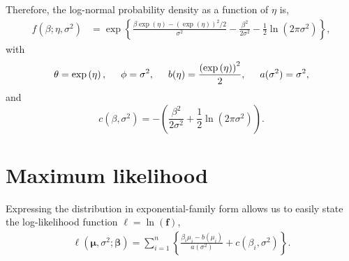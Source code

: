 Therefore, the log-normal probability density as a function of $\eta$ is,
\begin{align*}
  f(\beta; \eta, \sigma^2) &= \exp\left\{ \frac{\beta \exp\left(\eta \right) - \left( \exp\left(\eta \right) \right)^2 / 2}{\sigma^2} - \frac{\beta^2}{2\sigma^2} - \frac{1}{2}\ln\left( 2\pi \sigma^2 \right)  \right\},
\end{align*}
with
$$\theta = \exp\left( \eta \right), \hspace{5mm} \phi = \sigma^2, \hspace{5mm} b(\eta) = \frac{\left( \exp\left( \eta \right) \right)^2}{2}, \hspace{5mm} a(\sigma^2) = \sigma^2,$$
and
$$c(\beta,\sigma^2) = - \left( \frac{\beta^2}{2\sigma^2} + \frac{1}{2}\ln\left( 2\pi \sigma^2 \right) \right).$$

\section{Maximum likelihood}

Expressing the distribution in exponential-family form allows us to easily state the log-likelihood function $\bm{\ell} = \ln(\bm{f})$,
\begin{align*}
  \bm{\ell}(\bm{\mu}, \sigma^2; \bm{\beta}) = \sum_{i=1}^n \left\{ \frac{\beta_i \mu_i - b(\mu_i)}{a(\sigma^2)} + c(\beta_i,\sigma^2) \right\}.
\end{align*}


